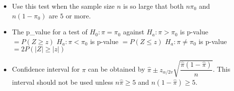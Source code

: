 \documentclass[twoside]{article}
\newcommand{\0}{\mathbf{0}}
\begin{document}
\begin{itemize}
\item Use this test when the sample size $n$ is so large that both $n\pi_0$ and $n(1 - \pi_0)$ are $5$ or more.
\item The p\_value for a test of $H_0: \pi = \pi_0$ against
\subsubitem $H_a: \pi > \pi_0$ is p-value $ = P(Z\geq z)$
\subsubitem $H_a: \pi < \pi_0$ is p-value $ = P(Z\leq z)$
\subsubitem $H_a: \pi \neq \pi_0$ is p-value $ = 2P(|Z|\geq|z|)$
\item Confidence interval for $\pi$ can be obtained by $\hat{\pi}\pm z_{\alpha/2 v }\sqrt{\dfrac{\hat{\pi}(1-\hat{\pi})}{n}}$.
This interval should not be used unless $n\hat{\pi} \geq 5$ and $n(1-\hat{\pi}) \geq 5$.

\end{itemize}
\end{document}
